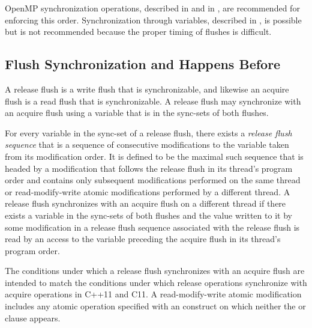 \begin{note}
OpenMP synchronization operations, described in 
 and in , 
are recommended for enforcing this order. Synchronization 
through variables, described in , is possible
but is not recommended because the proper timing of flushes is difficult.
\end{note}



\subsection{Flush Synchronization and Happens Before}
\label{subsec:happens-before}

A release flush is a write flush that is synchronizable, and likewise an
acquire flush is a read flush that is synchronizable.  A release flush may
synchronize with an acquire flush using a variable that is in the sync-sets of
both flushes.

For every variable in the sync-set of a release flush, there exists a
\emph{release flush sequence} that is a sequence of consecutive modifications
to the variable taken from its modification order. It is defined to be the
maximal such sequence that is headed by a modification that follows the
release flush in its thread's program order and contains only subsequent
modifications performed on the same thread or read-modify-write atomic
modifications performed by a different thread.  A release flush synchronizes
with an acquire flush on a different thread if there exists a variable in the
sync-sets of both flushes and the value written to it by some modification in
a release flush sequence associated with the release flush is read by an
access to the variable preceding the acquire flush in its thread's
program order.

\begin{note}
The conditions under which a release flush synchronizes with an acquire flush
are intended to match the conditions under which release operations
synchronize with acquire operations in C++11 and C11. A read-modify-write atomic
modification includes any atomic operation specified with an 
construct on which neither the  or  clause appears.
\end{note}

